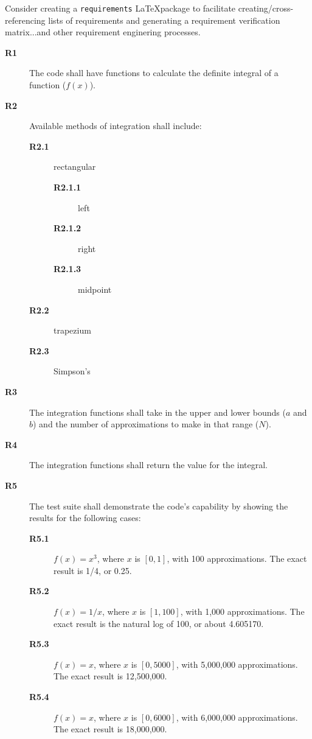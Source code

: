 \label{Functional_Requirements}

\begin{future}
Consider creating a \lstinline{requirements} \LaTeX package to facilitate creating/cross-referencing 
lists of requirements and generating a requirement verification matrix...and other requirement enginering processes.
\end{future}

\makeatletter
\newcommand{\req}[1]{
  \textbf{R#1}
  \def\@currentlabel{R#1}\label{req#1}
}
\makeatother

\begin{description}
  \item[\req{1}] The code shall have functions to calculate the definite integral of a function ($f(x)$).
  \item[\req{2}] Available methods of integration shall include:
  \begin{description}
    \item[\req{2.1}] rectangular
      \begin{description}
        \item[\req{2.1.1}] left
        \item[\req{2.1.2}] right
        \item[\req{2.1.3}] midpoint
      \end{description}
    \item[\req{2.2}] trapezium
    \item[\req{2.3}] Simpson's 
  \end{description}
  \item[\req{3}] The integration functions shall take in the upper and lower bounds ($a$ and $b$) and the number of 
approximations to make in that range ($N$). 
  \item[\req{4}] The integration functions shall return the value for the integral.
  \item[\req{5}] The test suite shall demonstrate the code's capability by showing the results for the following cases:
  \begin{description}
    \item[\req{5.1}]
    $f(x) = x^3$, where $x$ is $[0,1]$, with 100 approximations. The exact result is 1/4, or 0.25.
    \item[\req{5.2}]
    $f(x) = 1/x$, where $x$ is $[1,100]$, with 1,000 approximations. The exact result is the natural log of 100, or about 4.605170.
    \item[\req{5.3}]
    $f(x) = x$, where $x$ is $[0,5000]$, with 5,000,000 approximations. The exact result is 12,500,000.
    \item[\req{5.4}]
    $f(x) = x$, where $x$ is $[0,6000]$, with 6,000,000 approximations. The exact result is 18,000,000.
  \end{description}
\end{description}
